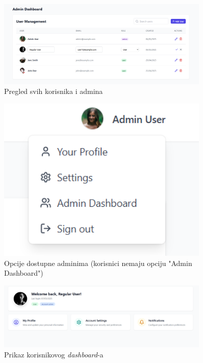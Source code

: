 \begin{figure}[H]
    \centering
    \includegraphics[width=0.9\textwidth]{Slike/fz3.7.png}
    \caption{Pregled svih korisnika i admina}
    \label{fig:fz3.7}
\end{figure}

\begin{figure}[H]
    \centering
    \includegraphics[width=0.9\textwidth]{Slike/fz3.8.png}
    \caption{Opcije dostupne adminima (korisnici nemaju opciju "Admin Dashboard")}
    \label{fig:fz3.8}
\end{figure}

\begin{figure}[H]
    \centering
    \includegraphics[width=0.9\textwidth]{Slike/fz3.9.png}
    \caption{Prikaz korisnikovog \textit{dashboard}-a}
    \label{fig:fz3.9}
\end{figure}

